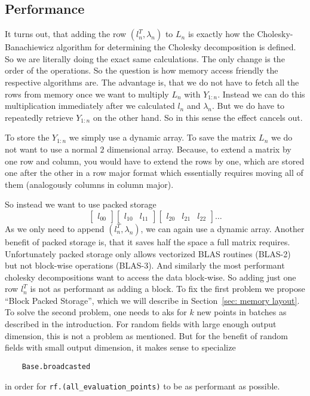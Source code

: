 \subsection{Performance}

It turns out, that adding the row \((l_n^T ,\lambda_n)\) to \(L_n\) is exactly
how the Cholesky-Banachiewicz algorithm for determining the Cholesky
decomposition is defined. So we are literally doing the exact same calculations.
The only change is the order of the operations. So the question is how memory
access friendly the respective algorithms are. The advantage is, that we do not
have to fetch all the rows from memory once we want to multiply
\(L_n\) with \(Y_{1:n}\). Instead we can do this multiplication immediately after
we calculated \(l_n\) and \(\lambda_n\). But we do have to repeatedly retrieve
\(Y_{1:n}\) on the other hand. So in this sense the effect cancels out.

To store the \(Y_{1:n}\) we simply use a dynamic array. To save the matrix \(L_n\)
we do not want to use a normal \(2\) dimensional array. Because, to extend a
matrix by one row and column, you would have to extend the rows by one, which
are stored one after the other in a row major format which essentially
requires moving all of them (analogously columns in column major).

So instead we want to use packed storage
\[
	\begin{bmatrix}
		l_{00}	
	\end{bmatrix}
	\begin{bmatrix}
		l_{10} & l_{11}
	\end{bmatrix}
	\begin{bmatrix}
		l_{20} & l_{21} & l_{22}
	\end{bmatrix}
	\dots
\]
As we only need to append \((l_n^T, \lambda_n)\), we can again use a dynamic
array. Another benefit of packed storage is, that it saves half the space a
full matrix requires. Unfortunately packed storage only allows vectorized BLAS routines
(BLAS-2) but not block-wise operations (BLAS-3). And similarly the most performant
cholesky decompositions want to access the data block-wise. So adding just one
row \(l_n^T\) is not as performant as adding a block. To fix the first problem
we propose ``Block Packed Storage'', which we will describe in Section~\ref{sec: memory
layout}. To solve the second problem, one needs to aks for \(k\) new points in
batches as described in the introduction. For random fields with large enough
output dimension, this is not a problem as mentioned. But for the benefit of
random fields with small output dimension, it makes sense to specialize
\begin{verbatim}
	Base.broadcasted
\end{verbatim}
in order for \texttt{rf.(all_evaluation_points)} to be as performant
as possible.


